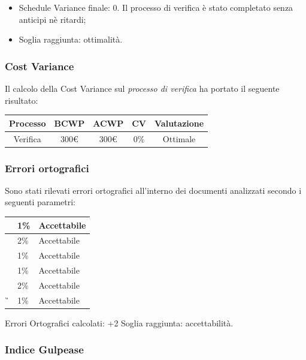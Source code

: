 \begin{itemize}
	\item Schedule Variance finale: 0. 
	Il processo di verifica è stato completato senza anticipi nè ritardi;
	
	\item Soglia raggiunta: ottimalità.
\end{itemize}


\subsubsection{Cost Variance}
Il calcolo della Cost Variance sul \emph{processo di verifica} ha portato il seguente risultato: 

{
	\renewcommand{\arraystretch}{2}
	\centering
	\begin{tabular}{| c | c | c | c | c |}
		\hline
		\textbf{Processo} & \textbf{BCWP} & \textbf{ACWP} & \textbf{CV} & \textbf{Valutazione} \\
		\hline
		Verifica & 300\euro & 300\euro & 0\% & Ottimale \\
		\hline
	\end{tabular}

}

\subsubsection{Errori ortografici}
Sono stati rilevati errori ortografici all'interno dei documenti analizzati secondo i seguenti parametri:
{
	\renewcommand{\arraystretch}{2}
	\centering
	\begin{tabular}{| c | C{1cm} | C{3cm} |}
			\hline
		\AdR{} & 1\% & Accettabile \\
			\hline
		\NdP{} & 2\% & Accettabile\\
			\hline
		\SdF{} & 1\% &  Accettabile \\
			\hline
		\PdP{} & 1\% & Accettabile \\
			\hline
		\PdQ{} & 2\% & Accettabile\\
			\hline
		\G{} & 1\% & Accettabile\\
			\hline
	\end{tabular}

}

Errori Ortografici calcolati: +2%
Soglia raggiunta: accettabilità.


\subsubsection{Indice Gulpease}

